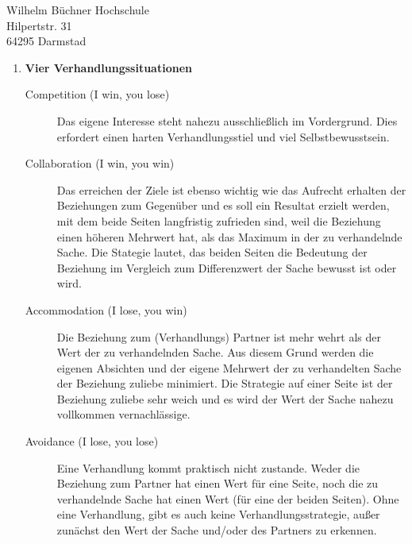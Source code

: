 \documentclass[
    version=last,           %
    DIV=13,                 %
    BCOR=0mm,               %
    paper=a4,               %
    fontsize=12pt,          %
    firsthead=on,           %
    firstfoot=on,           %
    pagenumber=on,i         %
    parskip=half,           %
    enlargefirstpage=,      %
    firsthead=on,           %
    fromrule=afteraddress,  %
    priority=off,           %
    backaddress=true,       %
    refline=dateright,      %
	fromalign=right,	    %
    fromemail=on,i          %
    fromurl=on,             %
    frombank=on,
    fromphone=on,           %
    frommobilephone=on      %
    fromlogo=on,            %
    addrfield=on,           %
    subject=untitled,  %
    foldmarks=off,          %
    numericaldate=off,      %
	pagenumber=right,	        %
	parskip=half,	        %
    headsep=false,          %
    footsepline=true,       %
    foldmarks=off,		    %
	]{scrlttr2}
\begin{document}
\begin{letter} {Wilhelm Büchner Hochschule \\
Hilpertstr. 31\\
64295 Darmstad}
\begin{itemize}
\begin{enumerate}
            \vspace{1cm}
            \item  \textbf{Vier Verhandlungssituationen}
                \begin{description}
                \item[Competition (I win, you lose) ]
                 Das eigene Interesse
                    steht nahezu ausschließlich im Vordergrund. Dies erfordert
                    einen harten Verhandlungsstiel und viel Selbstbewusstsein.
                \item[Collaboration (I win, you win) ]
                    Das erreichen der Ziele ist ebenso wichtig wie das Aufrecht
                    erhalten der Beziehungen zum Gegenüber und es soll ein
                    Resultat erzielt werden, mit dem beide Seiten langfristig
                    zufrieden sind, weil die Beziehung einen höheren Mehrwert
                    hat, als das Maximum in der zu verhandelnde Sache.
                    Die Stategie lautet, das beiden Seiten die Bedeutung der
                    Beziehung im Vergleich zum Differenzwert der Sache bewusst
                    ist oder wird.
                \item[Accommodation (I lose, you win) ]
                    Die Beziehung zum (Verhandlungs) Partner ist mehr wehrt als
                    der Wert der zu verhandelnden Sache. Aus diesem Grund werden
                    die eigenen Absichten und der eigene Mehrwert der zu
                    verhandelten Sache der Beziehung zuliebe minimiert.
                    Die Strategie auf einer Seite ist der Beziehung zuliebe sehr
                    weich und es wird der Wert der Sache nahezu vollkommen
                    vernachlässige.
                \item[Avoidance (I lose, you lose) ]
                    Eine Verhandlung kommt praktisch nicht zustande. Weder die
                    Beziehung zum Partner hat einen Wert für eine Seite, noch
                    die zu verhandelnde Sache hat einen Wert (für eine der beiden
                    Seiten). Ohne eine Verhandlung, gibt es auch keine
                    Verhandlungsstrategie, außer zunächst den Wert der Sache
                    und/oder des Partners zu erkennen.
                \end{description}


\end{enumerate}
\end{itemize}
\end{letter}
\end{document}
